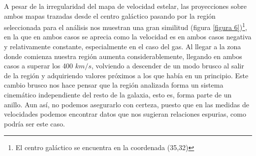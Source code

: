 \documentclass{article}
\begin{document}
A pesar de la irregularidad del mapa de velocidad estelar, las proyecciones sobre ambos mapas trazadas desde el centro galáctico pasando por la región seleccionada para el análisis nos muestran una gran similitud (figura \ref{figura 6})\footnote{El centro galáctico se encuentra en la coordenada (35,32)}, en la que en ambos casos se aprecia como la velocidad es en ambos casos negativa y relativamente constante, especialmente en el caso del gas. Al llegar a la zona donde comienza nuestra región aumenta considerablemente, llegando en ambos casos a superar los 400 $km/s$, volviendo a descender de un modo brusco al salir de la región y adquiriendo valores próximos a los que había en un principio. Este cambio brusco nos hace pensar que la región analizada forma un sistema cinemático independiente del resto de la galaxia, esto es, forma parte de un anillo. Aun así, no podemos asegurarlo con certeza, puesto que en las medidas de velocidades podemos encontrar datos que nos sugieran relaciones espurias, como podría ser este caso.
\end{document}
